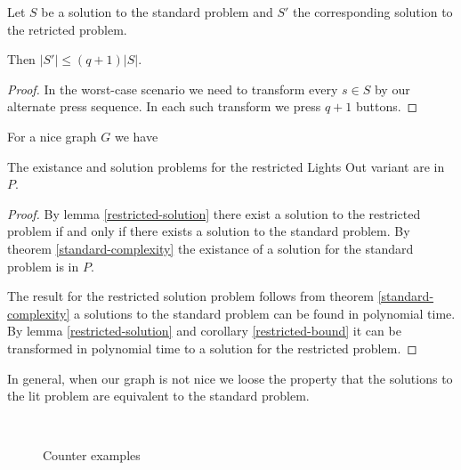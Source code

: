 \begin{corollary}\label{restricted-bound}
    Let $S$ be a solution to the standard problem and $S'$ the corresponding solution to the retricted problem.

    Then $|S'|\leq(q+1)|S|$.
\end{corollary}

\begin{proof}
    In the worst-case scenario we need to transform every $s\in S$ by our alternate press sequence. In each such transform we press $q+1$ buttons. 
\end{proof}

\begin{theorem}
    For a nice graph $G$ we have

    The existance and solution problems for the restricted Lights Out variant are in $P$.
\end{theorem}

\begin{proof}
    By lemma \ref{restricted-solution} there exist a solution to the restricted problem if and only if there exists a solution to the standard problem.
    By theorem \ref{standard-complexity} the existance of a solution for the standard problem is in $P$.

    The result for the restricted solution problem follows from theorem \ref{standard-complexity} a solutions to the standard problem can be found in polynomial time.
    By lemma \ref{restricted-solution} and corollary \ref{restricted-bound} it can be transformed in polynomial time to a solution for the restricted problem.
\end{proof}

In general, when our graph is not nice we loose the property that the solutions to the lit problem are equivalent to the standard problem.

\begin{figure}\label{figure:not-nice-counter-examples}
  \mbox{
    \label{counter-example:not-reflexive}
    \label{counter-example:not-symmetric}
    \label{counter-example:not-same-weight}
   }
  \caption{Counter examples}
\end{figure}